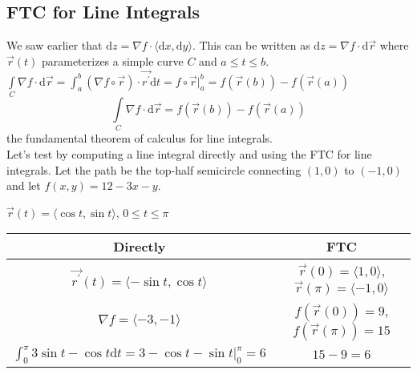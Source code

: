 \subsection{FTC for Line Integrals}
\noindent
We saw earlier that $\mathrm{d}z=\nabla f\cdot\langle\mathrm{d}x,\mathrm{d}y\rangle$. This can be written as $\mathrm{d}z=\nabla f\cdot\mathrm{d}\vec{r}$ where $\vec{r}(t)$ parameterizes a simple curve $C$ and $a\leq t\leq b$.\\
$\int\limits_{C}{\nabla f\cdot\mathrm{d}\vec{r}}=\int_{a}^{b}{(\nabla f\circ\vec{r})\cdot\vec{r^\prime}\mathrm{d}t}=f\circ\vec{r}\rvert_{a}^{b}=f(\vec{r}(b))-f(\vec{r}(a))$
$$\int\limits_{C}{\nabla f\cdot\mathrm{d}\vec{r}}=f(\vec{r}(b))-f(\vec{r}(a))$$ the fundamental theorem of calculus for line integrals.\\

\noindent
Let's test by computing a line integral directly and using the FTC for line integrals. Let the path be the top-half semicircle connecting $(1,0)$ to $(-1,0)$ and let $f(x,y)=12-3x-y$.
\begin{center}
	$\vec{r}(t)=\langle\cos{t},\sin{t}\rangle$, $0\leq t\leq\pi$
	\begin{tabular}{c|c}
		Directly & FTC \\
		\hline
		$\vec{r^\prime}(t)=\langle-\sin{t},\cos{t}\rangle$ & $\vec{r}(0)=\langle 1,0\rangle$, $\vec{r}(\pi)=\langle -1, 0\rangle$ \\
		$\nabla f = \langle -3, -1 \rangle$ & $f(\vec{r}(0))=9$, $f(\vec{r}(\pi))=15$ \\
		$\int_{0}^{\pi}{3\sin{t}-\cos{t}\mathrm{d}t}=3-\cos{t}-\sin{t}\rvert_{0}^{\pi}=6$ & $15-9=6$ \\
	\end{tabular}
\end{center}

